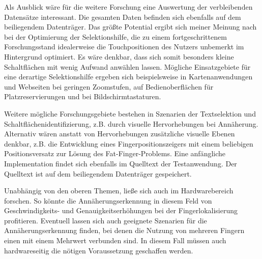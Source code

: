 \documentclass[12pt,bibliography=totocnumbered,listof=totocnumbered,abstracton]{scrreprt}
\begin{document}
Als Ausblick wäre für die weitere Forschung eine Auswertung der verbleibenden Datensätze interessant. Die gesamten Daten befinden sich ebenfalls auf dem beiliegendem Datenträger. Das größte Potential ergibt sich meiner Meinung nach bei der Optimierung der Selektionshilfe, die zu einem fortgeschrittenem Forschungsstand idealerweise die Touchpositionen des Nutzers unbemerkt im Hintergrund optimiert. Es wäre denkbar, dass sich somit besonders kleine Schaltflächen mit wenig Aufwand anwählen lassen. Mögliche Einsatzgebiete für eine derartige Selektionshilfe ergeben sich beispielsweise in Kartenanwendungen und Webseiten bei geringen Zoomstufen, auf Bedienoberflächen für Platzreservierungen und bei Bildschirmtastaturen.

Weitere mögliche Forschungsgebiete bestehen in Szenarien der Textselektion und Schaltflächenidentifizierung, z.B. durch visuelle Hervorhebungen bei Annäherung.\\
Alternativ wären anstatt von Hervorhebungen zusätzliche visuelle Ebenen denkbar, z.B. die Entwicklung eines Fingerpositionszeigers mit einem beliebigen Positionsversatz zur Lösung des Fat-Finger-Problems. Eine anfängliche Implementation findet sich ebenfalls im Quelltext der Testanwendung. Der Quelltext ist auf dem beiliegendem Datenträger gespeichert.

Unabhängig von den oberen Themen, ließe sich auch im Hardwarebereich forschen. So könnte die Annäherungserkennung in diesem Feld von Geschwindigkeits- und Genauigkeitserhöhungen bei der Fingerlokalisierung profitieren. Eventuell lassen sich auch geeignete Szenarien für die Annäherungserkennung finden, bei denen die Nutzung von mehreren Fingern einen mit einem Mehrwert verbunden sind. In diesem Fall müssen auch hardwareseitig die nötigen Voraussetzung geschaffen werden.
\end{document}
